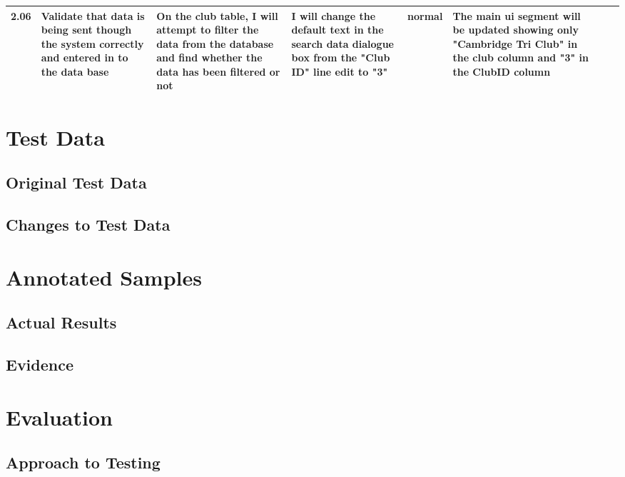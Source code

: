 \begin{landscape}
\begin{center}
\begin{longtable}{|p{1.5cm}|p{2.5cm}|p{2.5cm}|p{2cm}|p{2cm}|p{2cm}|p{2cm}|p{2cm}|}
        \rowcolor{LiteGray} 2.06 & Validate that data is being sent though the system correctly and entered in to the data base & On the club table, I will attempt to filter the data from the database and find whether the data has been filtered or not & I will  change the default text in the search data dialogue box from the "Club ID" line edit to "3" & normal & The main ui segment will be updated showing only "Cambridge Tri Club" in the club column and "3" in the ClubID column  & & \\ \hline
    \end{longtable}
\end{center}


\section{Test Data}

\subsection{Original Test Data}

\subsection{Changes to Test Data}

\section{Annotated Samples}

\subsection{Actual Results}

\subsection{Evidence}

\end{landscape}

\section{Evaluation}

\subsection{Approach to Testing}

